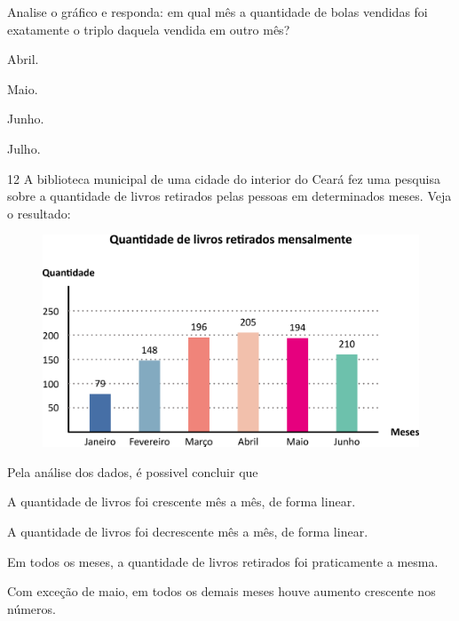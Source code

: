 Analise o gráfico e responda: em qual mês a quantidade de bolas vendidas foi exatamente o triplo daquela vendida em outro mês?

\begin{escolha}
\item
  Abril.
\item
  Maio.
\item
  Junho.
\item
  Julho.
\end{escolha}

\pagebreak

\num{12} A biblioteca municipal de uma cidade do interior do Ceará fez uma pesquisa sobre a quantidade de livros retirados pelas pessoas em determinados meses. Veja o resultado:

\begin{figure}[htpb!]
\centering
\includegraphics[width=\textwidth]{./media/image106.png}
\end{figure}

Pela análise dos dados, é possivel concluir que

\begin{escolha}
\item
  A quantidade de livros foi crescente mês a mês, de forma linear.
\item
  A quantidade de livros foi decrescente mês a mês, de forma linear.
\item
  Em todos os meses, a quantidade de livros retirados foi praticamente a mesma.
\item
  Com exceção de maio, em todos os demais meses houve aumento crescente nos números.
\end{escolha}

